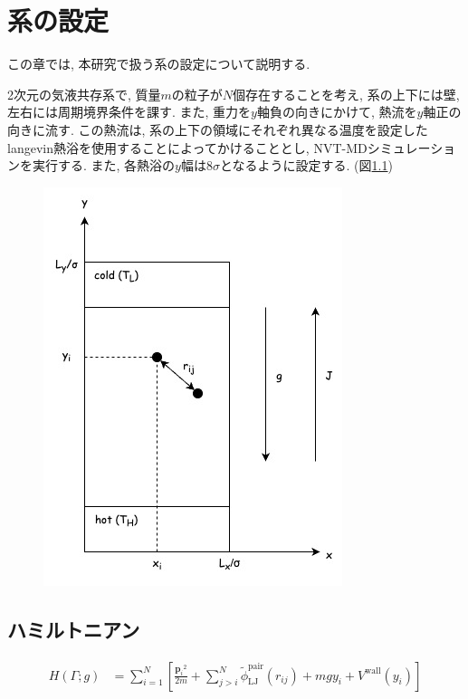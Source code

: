 \chapter{系の設定}

この章では, 本研究で扱う系の設定について説明する. 

2次元の気液共存系で, 質量$m$の粒子が$N$個存在することを考え, 系の上下には壁, 左右には周期境界条件を課す. また, 重力を$y$軸負の向きにかけて, 熱流を$y$軸正の向きに流す. この熱流は, 系の上下の領域にそれぞれ異なる温度を設定したlangevin熱浴を使用することによってかけることとし, NVT-MDシミュレーションを実行する. また, 各熱浴の$y$幅は$8\sigma$となるように設定する. (図\ref{fig:system})


\begin{figure}[H]
  \centering
  \caption{}
  \label{fig:system}
  \includegraphics[scale=0.7]{image/system.jpg}
\end{figure}

\section{ハミルトニアン}

\begin{align}
  \label{Hamiltonian}
  H(\Gamma; g)
  &= \sum_{i=1}^{N}
  \left[
    \frac{{\bm{p}_i}^2}{2m} 
    + \sum_{j > i}^{N}
      \tilde{\phi}_{\text{LJ}}^{\text{pair}}(r_{ij})
    + mgy_i
    + V^{\text{wall}} (y_i)
  \right] 
\end{align}

